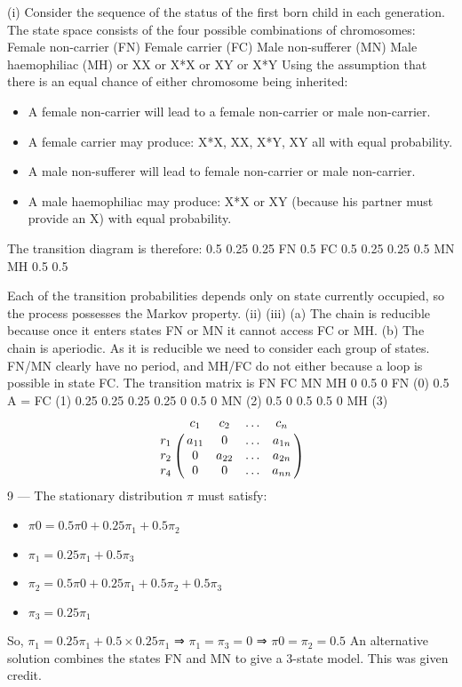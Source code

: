 \documentclass[a4paper,12pt]{article}
\begin{document}
(i)
Consider the sequence of the status of the first born child in each generation.
The state space consists of the four possible combinations of chromosomes:
Female non-carrier (FN)
Female carrier
(FC)
Male non-sufferer (MN)
Male haemophiliac (MH)
or XX
or X*X
or XY
or X*Y
Using the assumption that there is an equal chance of either chromosome
being inherited:
\begin{itemize}
\item A female non-carrier will lead to a female non-carrier or male non-carrier.
\item A female carrier may produce:
X*X, XX, X*Y, XY all with equal probability.
\item A male non-sufferer will lead to female non-carrier or male non-carrier.
\item A male haemophiliac may produce:
X*X or XY (because his partner must provide an X) with equal
probability.
\end{itemize}
The transition diagram is therefore:
0.5
0.25
0.25
FN
0.5
FC
0.5
0.25
0.25
0.5
MN
MH
0.5
0.5



Each of the transition probabilities depends only on state currently occupied,
so the process possesses the Markov property.
(ii)
(iii)
(a) The chain is reducible because once it enters states FN or MN it cannot
access FC or MH.
(b) The chain is aperiodic.
As it is reducible we need to consider each group of states. FN/MN
clearly have no period, and MH/FC do not either because a loop is
possible in state FC.
The transition matrix is
FN FC MN MH
0
0.5
0
FN (0) 0.5
A = FC (1) 0.25 0.25 0.25 0.25
0
0.5
0
MN (2) 0.5
0
0.5 0.5
0
MH (3)
$$\bordermatrix{ &c_1&c_2&\ldots &c_n\cr
                r_1&a_{11} &  0  & \ldots & a_{1n}\cr
                r_2& 0  &  a_{22} & \ldots & a_{2n}\cr
                r_4& 0  &   0       &\ldots & a_{nn}}$$
9 — %
The stationary distribution $\pi$ must satisfy:
\begin{itemize}
    \item ${\displaystyle \pi 0 = 0.5 \pi 0 + 0.25 \pi_1 + 0.5 \pi_2 }$
    \item ${\displaystyle \pi_1 = 0.25 \pi_1 + 0.5 \pi_3}$
    \item ${\displaystyle \pi_2 = 0.5 \pi 0 + 0.25 \pi_1 + 0.5 \pi_2 + 0.5 \pi_3}$
    \item ${\displaystyle \pi_3 = 0.25 \pi_1}$
\end{itemize}

So,
${\displaystyle \pi_1 = 0.25 \pi_1 + 0.5 \times0.25 \pi_1}$
⇒ 
${\displaystyle \pi_1 = \pi_3 = 0}$
⇒ 
${\displaystyle \pi 0 = \pi_2 = 0.5}$
An alternative solution combines the states FN and MN to give a 3-state model. This
was given credit.
\end{document}
